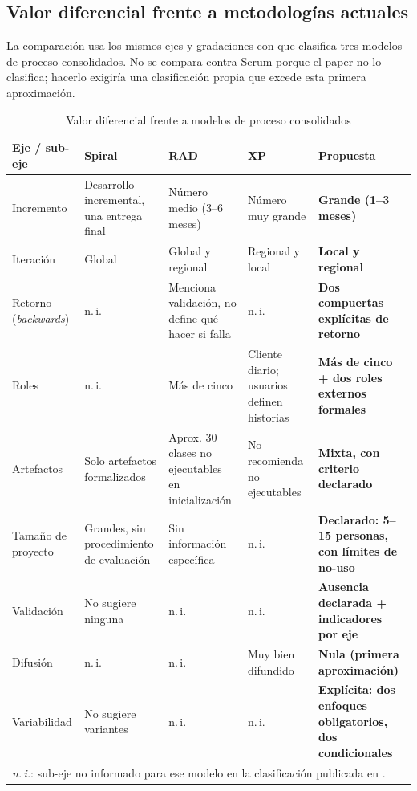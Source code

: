 \documentclass[conference]{IEEEtran}
\begin{document}
\subsection{Valor diferencial frente a metodologías actuales}

La comparación usa los mismos ejes y gradaciones con que \cite{Ceret2013} clasifica tres modelos de proceso consolidados. No se compara contra Scrum porque el paper no lo clasifica; hacerlo exigiría una clasificación propia que excede esta primera aproximación.

\begin{table}[!t]
\centering
\footnotesize
\caption{Valor diferencial frente a modelos de proceso consolidados}
\begin{tabular}{p{}p{}p{}p{}p{}}
\hline
\textbf{Eje / sub-eje} & \textbf{Spiral} & \textbf{RAD} & \textbf{XP} & \textbf{Propuesta} \\ \hline
Incremento & Desarrollo incremental, una entrega final & Número medio (3–6 meses) & Número muy grande & \textbf{Grande (1–3 meses)} \\ \hline
Iteración & Global & Global y regional & Regional y local & \textbf{Local y regional} \\ \hline
Retorno (\textit{backwards}) & n.\,i. & Menciona validación, no define qué hacer si falla & n.\,i. & \textbf{Dos compuertas explícitas de retorno} \\ \hline
Roles & n.\,i. & Más de cinco & Cliente diario; usuarios definen historias & \textbf{Más de cinco + dos roles externos formales} \\ \hline
Artefactos & Solo artefactos formalizados & Aprox. 30 clases no ejecutables en inicialización & No recomienda no ejecutables & \textbf{Mixta, con criterio declarado} \\ \hline
Tamaño de proyecto & Grandes, sin procedimiento de evaluación & Sin información específica & n.\,i. & \textbf{Declarado: 5–15 personas, con límites de no-uso} \\ \hline
Validación & No sugiere ninguna & n.\,i. & n.\,i. & \textbf{Ausencia declarada + indicadores por eje} \\ \hline
Difusión & n.\,i. & n.\,i. & Muy bien difundido & \textbf{Nula (primera aproximación)} \\ \hline
Variabilidad & No sugiere variantes & n.\,i. & n.\,i. & \textbf{Explícita: dos enfoques obligatorios, dos condicionales} \\ \hline
\multicolumn{5}{p{0.92\textwidth}}{\vspace{2pt}\textit{n.\,i.}: sub-eje no informado para ese modelo en la clasificación publicada en \cite{Ceret2013}.} \\
\end{tabular}
\end{table}
\end{document}
